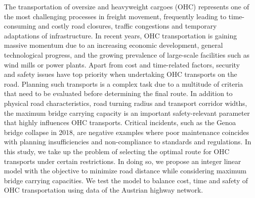 
The transportation of oversize and heavyweight cargoes (OHC) represents one of the most challenging processes in freight movement, frequently leading to time-consuming and costly road closures, traffic congestions and temporary adaptations of infrastructure. In recent years, OHC transportation is gaining massive momentum due to an increasing economic development, general technological progress, and the growing prevalence of large-scale facilities such as wind mills or power plants. Apart from cost and time-related factors, security and safety issues have top priority when undertaking OHC transports on the road. Planning such transports is a complex task due to a multitude of criteria that need to be evaluated before determining the final route. In addition to physical road characteristics, road turning radius and transport corridor widths, the maximum bridge carrying capacity is an important safety-relevant parameter that highly influences OHC transports. Critical incidents, such as the Genoa bridge collapse in 2018, are negative examples where poor maintenance coincides with planning insufficiencies and non-compliance to standards and regulations. In this study, we take up the problem of selecting the optimal route for OHC transports under certain restrictions. In doing so, we propose an integer linear model with the objective to minimize road distance while considering maximum bridge carrying capacities. We test the model to balance cost, time and safety of OHC transportation using data of the Austrian highway network.
